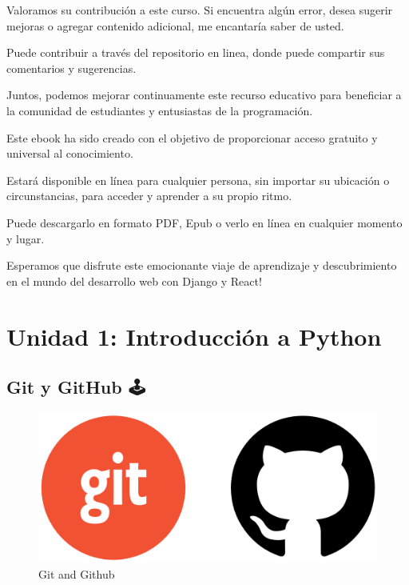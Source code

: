 \documentclass[
  a4paper,
  DIV=11,
  numbers=noendperiod,
  onepage,
  openany]{scrreprt}
\begin{document}
Valoramos su contribución a este curso. Si encuentra algún error, desea
sugerir mejoras o agregar contenido adicional, me encantaría saber de
usted.

Puede contribuir a través del repositorio en linea, donde puede
compartir sus comentarios y sugerencias.

Juntos, podemos mejorar continuamente este recurso educativo para
beneficiar a la comunidad de estudiantes y entusiastas de la
programación.

Este ebook ha sido creado con el objetivo de proporcionar acceso
gratuito y universal al conocimiento.

Estará disponible en línea para cualquier persona, sin importar su
ubicación o circunstancias, para acceder y aprender a su propio ritmo.

Puede descargarlo en formato PDF, Epub o verlo en línea en cualquier
momento y lugar.

Esperamos que disfrute este emocionante viaje de aprendizaje y
descubrimiento en el mundo del desarrollo web con Django y React!

\part{Unidad 1: Introducción a Python}

\chapter{Git y GitHub 🕹️}\label{git-y-github}

\begin{figure}[H]

{\centering \includegraphics[width=6.25in,height=\textheight]{unidades/unidad1/../../images/git_and_github.png}

}

\caption{Git and Github}

\end{figure}%
\end{document}
